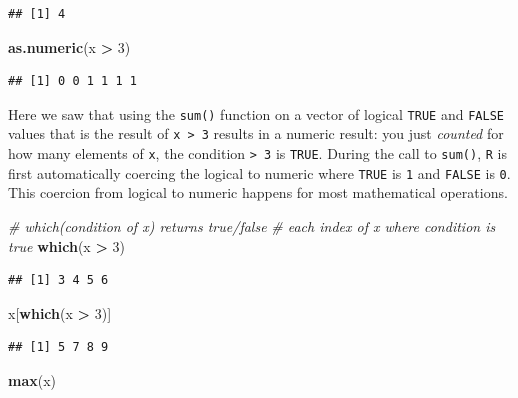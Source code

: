 \documentclass[]{book}
\newenvironment{Shaded}{\begin{snugshade}}{\end{snugshade}}
\newcommand{\KeywordTok}[1]{\textcolor[rgb]{0.13,0.29,0.53}{\textbf{#1}}}
\newcommand{\DecValTok}[1]{\textcolor[rgb]{0.00,0.00,0.81}{#1}}
\newcommand{\StringTok}[1]{\textcolor[rgb]{0.31,0.60,0.02}{#1}}
\newcommand{\CommentTok}[1]{\textcolor[rgb]{0.56,0.35,0.01}{\textit{#1}}}
\newcommand{\OperatorTok}[1]{\textcolor[rgb]{0.81,0.36,0.00}{\textbf{#1}}}
\newcommand{\NormalTok}[1]{#1}
\begin{document}
\begin{verbatim}
## [1] 4
\end{verbatim}

\begin{Shaded}
\begin{Highlighting}[]
\KeywordTok{as.numeric}\NormalTok{(x }\OperatorTok{>}\StringTok{ }\DecValTok{3}\NormalTok{)}
\end{Highlighting}
\end{Shaded}

\begin{verbatim}
## [1] 0 0 1 1 1 1
\end{verbatim}

Here we saw that using the \texttt{sum()} function on a vector of
logical \texttt{TRUE} and \texttt{FALSE} values that is the result of
\texttt{x\ \textgreater{}\ 3} results in a numeric result: you just
\emph{counted} for how many elements of \texttt{x}, the condition
\texttt{\textgreater{}\ 3} is \texttt{TRUE}. During the call to
\texttt{sum()}, \texttt{R} is first automatically coercing the logical
to numeric where \texttt{TRUE} is \texttt{1} and \texttt{FALSE} is
\texttt{0}. This coercion from logical to numeric happens for most
mathematical operations.

\begin{Shaded}
\begin{Highlighting}[]
\CommentTok{# which(condition of x) returns true/false  }
\CommentTok{# each index of x where condition is true}
\KeywordTok{which}\NormalTok{(x }\OperatorTok{>}\StringTok{ }\DecValTok{3}\NormalTok{)}
\end{Highlighting}
\end{Shaded}

\begin{verbatim}
## [1] 3 4 5 6
\end{verbatim}

\begin{Shaded}
\begin{Highlighting}[]
\NormalTok{x[}\KeywordTok{which}\NormalTok{(x }\OperatorTok{>}\StringTok{ }\DecValTok{3}\NormalTok{)]}
\end{Highlighting}
\end{Shaded}

\begin{verbatim}
## [1] 5 7 8 9
\end{verbatim}

\begin{Shaded}
\begin{Highlighting}[]
\KeywordTok{max}\NormalTok{(x)}
\end{Highlighting}
\end{Shaded}
\end{document}
